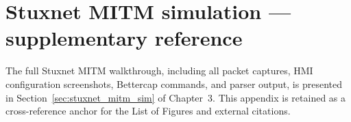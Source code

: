 \documentclass[../main.tex]{subfiles}
\begin{document}
\section{Stuxnet MITM simulation --- supplementary reference}
\label{app:stuxnet_mitm}

The full Stuxnet MITM walkthrough, including all packet captures, HMI configuration screenshots, Bettercap commands, and parser output, is presented in Section~\ref{sec:stuxnet_mitm_sim} of Chapter~3. This appendix is retained as a cross-reference anchor for the List of Figures and external citations.
\end{document}
